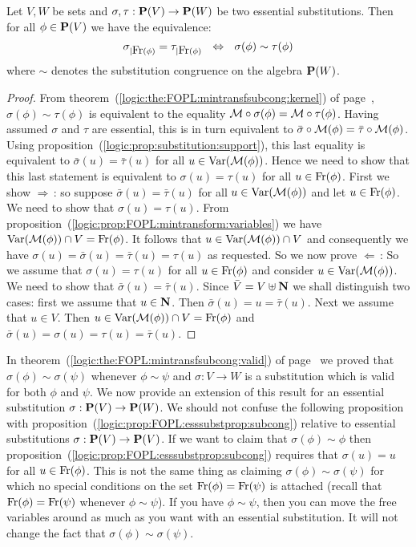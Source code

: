 \begin{prop}\label{logic:prop:FOPL:esssubstprop:support}
Let $V,W$ be sets and $\sigma,\tau:\mbox{${\bf P}(V)$}\to{\bf P}(W)$ be two
essential substitutions. Then for all $\phi\in\mbox{${\bf P}(V)$}$ we have the
equivalence:
    \[
    \sigma_{|\free(\phi)}=\tau_{|\free(\phi)}\ \ \Leftrightarrow\
    \ \sigma(\phi)\sim\tau(\phi)
    \]
where $\sim$ denotes the substitution congruence on the algebra
${\bf P}(W)$.
\end{prop}
\begin{proof}
From theorem~(\ref{logic:the:FOPL:mintransfsubcong:kernel}) of
page~\pageref{logic:the:FOPL:mintransfsubcong:kernel},
$\sigma(\phi)\sim\tau(\phi)$ is equivalent to the equality ${\cal
M}\circ\sigma(\phi)={\cal M}\circ\tau(\phi)$. Having assumed
$\sigma$ and $\tau$ are essential, this is in turn equivalent to
$\bar{\sigma}\circ{\cal M}(\phi)=\bar{\tau}\circ{\cal M}(\phi)$.
Using proposition~(\ref{logic:prop:substitution:support}), this last
equality is equivalent to $\bar{\sigma}(u)=\bar{\tau}(u)$ for all
$u\in\mbox{\rm Var}({\cal M}(\phi))$. Hence we need to show that this last
statement is equivalent to $\sigma(u)=\tau(u)$ for all
$u\in\mbox{\rm Fr}(\phi)$. First we show $\Rightarrow$\,: so suppose
$\bar{\sigma}(u)=\bar{\tau}(u)$ for all $u\in\mbox{\rm Var}({\cal M}(\phi))$
and let $u\in\mbox{\rm Fr}(\phi)$. We need to show that $\sigma(u)=\tau(u)$.
From proposition~(\ref{logic:prop:FOPL:mintransform:variables}) we
have $\mbox{\rm Var}({\cal M}(\phi))\cap V=\mbox{\rm Fr}(\phi)$. It follows that
$u\in\mbox{\rm Var}({\cal M}(\phi))\cap V$ and consequently we have
$\sigma(u)=\bar{\sigma}(u)=\bar{\tau}(u)=\tau(u)$ as requested. So
we now prove $\Leftarrow$\,: So we assume that $\sigma(u)=\tau(u)$
for all $u\in\mbox{\rm Fr}(\phi)$ and consider $u\in\mbox{\rm Var}({\cal M}(\phi))$.
We need to show that $\bar{\sigma}(u)=\bar{\tau}(u)$. Since
$\bar{V}=V\uplus\mbox{$\bf N$}$ we shall distinguish two cases: first we assume
that $u\in\mbox{$\bf N$}$. Then $\bar{\sigma}(u)=u=\bar{\tau}(u)$. Next we
assume that $u\in V$. Then $u\in \mbox{\rm Var}({\cal M}(\phi))\cap
V=\mbox{\rm Fr}(\phi)$ and
$\bar{\sigma}(u)=\sigma(u)=\tau(u)=\bar{\tau}(u)$.
\end{proof}

In theorem~(\ref{logic:the:FOPL:mintransfsubcong:valid}) of
page~\pageref{logic:the:FOPL:mintransfsubcong:valid} we proved that
$\sigma(\phi)\sim\sigma(\psi)$ whenever $\phi\sim\psi$ and
$\sigma:V\to W$ is a substitution which is valid for both $\phi$ and
$\psi$. We now provide an extension of this result for an essential
substitution $\sigma:\mbox{${\bf P}(V)$}\to{\bf P}(W)$. We should not confuse the
following proposition with
proposition~(\ref{logic:prop:FOPL:esssubstprop:subcong}) relative to
essential substitutions $\sigma:\mbox{${\bf P}(V)$}\to\mbox{${\bf P}(V)$}$. If we want to claim that
$\sigma(\phi)\sim\phi$ then
proposition~(\ref{logic:prop:FOPL:esssubstprop:subcong}) requires
that $\sigma(u)=u$ for all $u\in\mbox{\rm Fr}(\phi)$. This is not the same
thing as claiming $\sigma(\phi)\sim\sigma(\psi)$ for which no
special conditions on the set $\mbox{\rm Fr}(\phi)=\mbox{\rm Fr}(\psi)$ is attached
(recall that $\mbox{\rm Fr}(\phi)=\mbox{\rm Fr}(\psi)$ whenever $\phi\sim\psi$). If
you have $\phi\sim\psi$, then you can move the free variables around
as much as you want with an essential substitution. It will not
change the fact that $\sigma(\phi)\sim\sigma(\psi)$.

